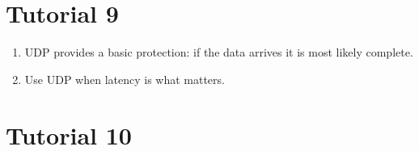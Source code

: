 \documentclass[12pt,a4paper]{article}
\begin{document}
\section{Tutorial 9}

\begin{enumerate}
  \item UDP provides a basic protection: if the data arrives it is most likely complete.
  \item Use UDP when latency is what matters.
\end{enumerate}

\section{Tutorial 10}
\end{document}
